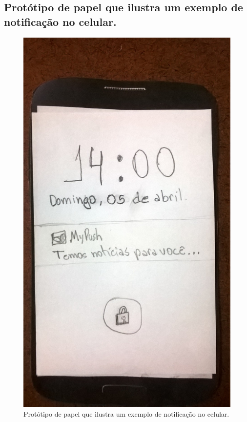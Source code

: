\begin{anexosenv}
    \pagebreak
    \section*{Protótipo de papel que ilustra um exemplo de notificação no celular.}
    
      \begin{figure}[!htbp]
	\centering
	\includegraphics[scale=0.32]{editaveis/figuras/prototipo_papel_v1/tela_bloqueio_notificacao}
	\caption{Protótipo de papel que ilustra um exemplo de notificação no celular.}
	\label{tela_bloqueio_notificacao_v1}
      \end{figure}
    

\end{anexosenv}
